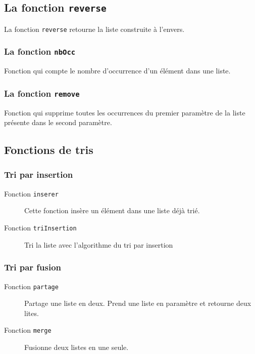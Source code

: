 \subsection{La fonction \texttt{reverse}}
La fonction \texttt{reverse} retourne la liste construite à l'envers.


\subsubsection{La fonction \texttt{nbOcc}}
Fonction qui compte le nombre d'occurrence d'un élément dans une liste.

\subsubsection{La fonction \texttt{remove}}
Fonction qui supprime toutes les occurrences du premier paramètre de la liste présente dans le second paramètre.


\subsection{Fonctions de tris}
\subsubsection{Tri par insertion}
\begin{description}
	\item[Fonction \texttt{inserer}] Cette fonction insère un élément dans une liste déjà trié.\\

	\item[Fonction \texttt{triInsertion}] Tri la liste avec l'algorithme du tri par insertion\\
		
\end{description}

\subsubsection{Tri par fusion}
\begin{description}
	\item[Fonction \texttt{partage}]Partage une liste en deux. Prend une liste en paramètre et retourne deux lites.
	
	\item[Fonction \texttt{merge}] Fusionne deux listes en une seule.
	
\end{description}

